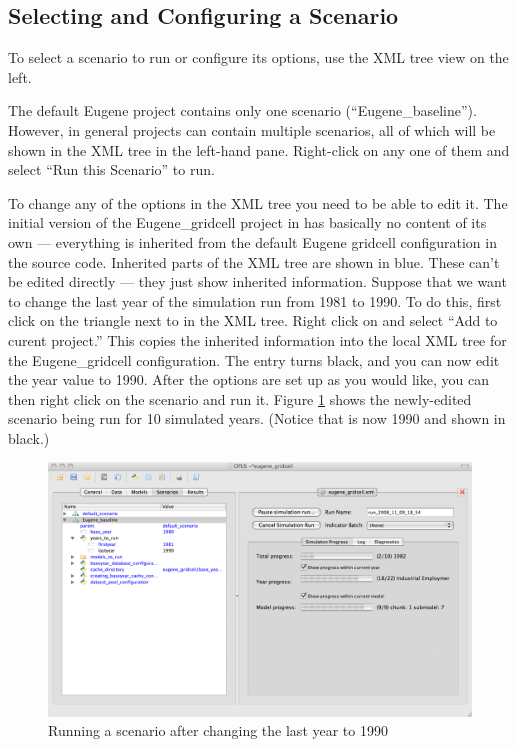 \subsection{Selecting and Configuring a Scenario}
\label{sec:configuring-scenario}

To select a scenario to run or configure its options, use the XML tree view
on the left.

The default Eugene project contains only one scenario
(``Eugene\_baseline'').  However, in general projects can contain multiple
scenarios, all of which will be shown in the XML tree in the left-hand
pane.  Right-click on any one of them and select ``Run this Scenario'' to
run.

To change any of the options in the XML tree you need to be able to edit
it.  The initial version of the Eugene\_gridcell project in
 has basically no
content of its own --- everything is inherited from the default Eugene
gridcell configuration in the source code.  Inherited parts of the XML tree
are shown in blue.  These can't be edited directly --- they just show
inherited information.  Suppose that we want to change the last year of the
simulation run from 1981 to 1990.  To do this, first click on the triangle
next to  in the XML tree.  Right click on
 and select ``Add to curent project.''  This copies the
inherited information into the local XML tree for the Eugene\_gridcell
configuration.  The  entry turns black, and you can now edit
the year value to 1990.  After the options are set up as you would like,
you can then right click on the scenario and run it.  Figure
\ref{fig:scenario-manager-change-lastyear} shows the newly-edited scenario
being run for 10 simulated years.  (Notice that  is now 1990
and shown in black.)

\begin{figure}[htp]
\begin{center}
\includegraphics[scale=0.4]{part-gui/images/scenario-manager-change-lastyear.png}
\end{center}
\caption{Running a scenario after changing the last year to 1990}
\label{fig:scenario-manager-change-lastyear}
\end{figure}


